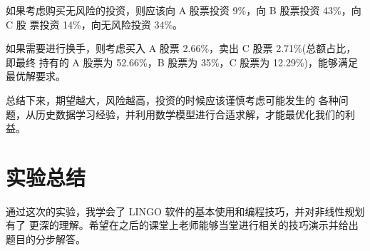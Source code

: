 \documentclass{article}
\begin{document}
如果考虑购买无风险的投资，则应该向 A 股票投资 9\%，向 B 股票投资 43\%，向 C 股 票投资 14\%，向无风险投资 34\%。


如果需要进行换手，则考虑买入 A 股票 2.66\%，卖出 C 股票 2.71\%(总额占比，即最终 持有的 A 股票为 52.66\%，B 股票为 35\%，C 股票为 12.29\%)，能够满足最优解要求。


总结下来，期望越大，风险越高，投资的时候应该谨慎考虑可能发生的 各种问题，从历史数据学习经验，并利用数学模型进行合适求解，才能最优化我们的利益。


\section{实验总结}

通过这次的实验，我学会了 LINGO 软件的基本使用和编程技巧，并对非线性规划有了 更深的理解。希望在之后的课堂上老师能够当堂进行相关的技巧演示并给出题目的分步解答。
\end{document}
